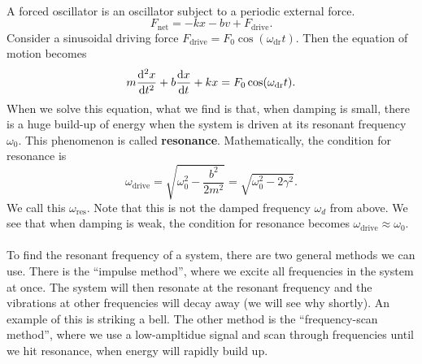 \documentclass[../classical_mechanics.tex]{subfiles}
\begin{document}
        \paragraph{}
        A forced oscillator is an oscillator subject to a periodic external force.
        \begin{equation}
            F_\text{net}=-kx-bv+F_\text{drive}.
        \end{equation}
        Consider a sinusoidal driving force $F_\text{drive}=F_0\cos(\omega_\text{dr}t)$.
        Then the equation of motion becomes
        \begin{equation}
            m\dv[2]{x}{t}+b\dv{x}{t}+kx=F_0\cos(\omega_\text{dr}t).
        \end{equation}
        When we solve this equation, what we find is that, when damping is small, there is a huge build-up of energy when the system is driven at its resonant frequency $\omega_0$.
        This phenomenon is called \textbf{resonance}.
        Mathematically, the condition for resonance is
        \begin{equation}
            \omega_\text{drive}=\sqrt{\omega_0^2-\frac{b^2}{2m^2}}=\sqrt{\omega_0^2-2\gamma^2}.
        \end{equation}
        We call this $\omega_\text{res}$.
        Note that this is not the damped frequency $\omega_d$ from above.
        We see that when damping is weak, the condition for resonance becomes $\omega_\text{drive}\approx\omega_0$.

        \paragraph{}
        To find the resonant frequency of a system, there are two general methods we can use.
        There is the ``impulse method'', where we excite all frequencies in the system at once.
        The system will then resonate at the resonant frequency and the vibrations at other frequencies will decay away (we will see why shortly).
        An example of this is striking a bell.
        The other method is the ``frequency-scan method'', where we use a low-ampltidue signal and scan through frequencies until we hit resonance, when energy will rapidly build up.
\end{document}
